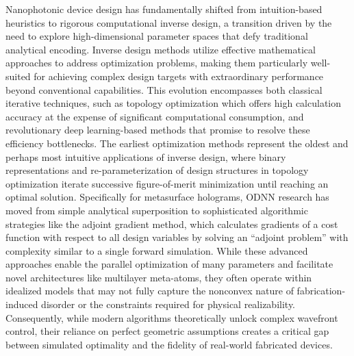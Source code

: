 \documentclass[11pt]{article}
\begin{document}
Nanophotonic device design has fundamentally shifted from intuition-based heuristics to rigorous computational inverse design, a transition driven by the need to explore high-dimensional parameter spaces that defy traditional analytical encoding. Inverse design methods utilize effective mathematical approaches to address optimization problems, making them particularly well-suited for achieving complex design targets with extraordinary performance beyond conventional capabilities. This evolution encompasses both classical iterative techniques, such as topology optimization which offers high calculation accuracy at the expense of significant computational consumption, and revolutionary deep learning-based methods that promise to resolve these efficiency bottlenecks. The earliest optimization methods represent the oldest and perhaps most intuitive applications of inverse design, where binary representations and re-parameterization of design structures in topology optimization iterate successive figure-of-merit minimization until reaching an optimal solution. Specifically for metasurface holograms, ODNN research has moved from simple analytical superposition to sophisticated algorithmic strategies like the adjoint gradient method, which calculates gradients of a cost function with respect to all design variables by solving an ``adjoint problem'' with complexity similar to a single forward simulation. \citep{doi_10_48550_arxiv_2603_15210_fdcfb92f} \citep{doi_10_1038_s41598_024_67142_2_db612126} While these advanced approaches enable the parallel optimization of many parameters and facilitate novel architectures like multilayer meta-atoms, they often operate within idealized models that may not fully capture the nonconvex nature of fabrication-induced disorder or the constraints required for physical realizability. Consequently, while modern algorithms theoretically unlock complex wavefront control, their reliance on perfect geometric assumptions creates a critical gap between simulated optimality and the fidelity of real-world fabricated devices. \citep{doi_10_1088_1361_6439_ad3a72_72d60f33} \citep{doi_10_1364_oe_27_030308_704a1c9b} \citep{s2_76a83ea3baed75ad88b7f0782eb9a694a330c853_cee16cac} \citep{doi_10_1515_nanoph_2021_0660_2d91a441}
\end{document}
